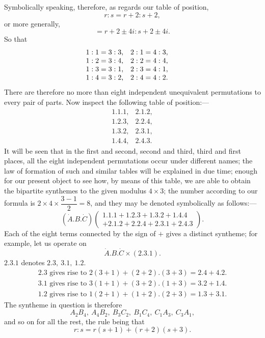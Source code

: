 \documentclass[11pt]{article}
\newcommand{\sourcepage}[1]{\marginpar{\scriptsize p.~#1}}
\newcommand{\dotter}[1]{\dot{#1}}
\begin{document}
{{\sourcepage{98}
Symbolically speaking, therefore, as regards our table of position,
\[
r:s=r+2:s+2,
\]
or more generally,
\[
=r+2\pm4i:s+2\pm4i.
\]
So that
\[
\begin{array}{ll@{\qquad}ll}
1:1=3:3,&2:1=4:3,\\
1:2=3:4,&2:2=4:4,\\
1:3=3:1,&2:3=4:1,\\
1:4=3:2,&2:4=4:2.
\end{array}
\]
There are therefore no more than eight independent unequivalent permutations to every pair of parts. Now inspect the following table of position:---
\[
\begin{array}{cc}
1.1.1,&2.1.2,\\
1.2.3,&2.2.4,\\
1.3.2,&2.3.1,\\
1.4.4,&2.4.3.
\end{array}
\]
It will be seen that in the first and second, second and third, third and first places, all the eight independent permutations occur under different names; the law of formation of such and similar tables will be explained in due time; enough for our present object to see how, by means of this table, we are able to obtain the bipartite synthemes to the given modulus $4\times3$; the number according to our formula is $2\times4\times\dfrac{3-1}{2}=8$, and they may be denoted symbolically as follows:---
\[
(\dotter A.B.\dotter C)
\left(\begin{array}{l}
1.1.1+1.2.3+1.3.2+1.4.4\\
+2.1.2+2.2.4+2.3.1+2.4.3
\end{array}\right).
\]
Each of the eight terms connected by the sign of $+$ gives a distinct syntheme; for example, let us operate on
\[
\dotter A.B.\dotter C\times(2.3.1).
\]
$2.3.1$ denotes $2.3,\ 3.1,\ 1.2$.
\[
\begin{array}{l}
2.3\text{ gives rise to }2(3+1)+(2+2).(3+3)=2.4+4.2.\\
3.1\text{ gives rise to }3(1+1)+(3+2).(1+3)=3.2+1.4.\\
1.2\text{ gives rise to }1(2+1)+(1+2).(2+3)=1.3+3.1.
\end{array}
\]
The syntheme in question is therefore
\[
A_2B_4,\ A_4B_2,\ B_3C_2,\ B_1C_4,\ C_1A_3,\ C_3A_1,
\]
and so on for all the rest, the rule being that
\[
r:s=r(s+1)+(r+2)(s+3).
\]

}}
\end{document}
